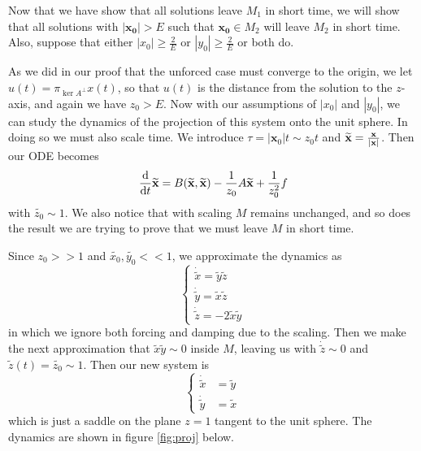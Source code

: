 \documentclass[11pt]{article}
\begin{document}
Now that we have show that all solutions leave $M_1$ in short time, we will show that all solutions with $|\mathbf{x_0}| > E$ such that $\mathbf{x_0} \in M_2$ will leave $M_2$ in short time. Also, suppose that either $|x_0| \geq \frac{2}{E}$ or $|y_0| \geq \frac{2}{E}$ or both do.

As we did in our proof that the unforced case must converge to the origin, we let $u(t) = \pi_{\ker A^{\perp}} x(t)$, so that $u(t)$ is the distance from the solution to the $z$-axis, and again we have $z_0 > E$. Now with our assumptions of $|x_0|$ and $|y_0|$, we can study the dynamics of the projection of this system onto the unit sphere. In doing so we must also scale time. We introduce $\tau = |\mathbf{x}_0|t \sim z_0t$ and $\widetilde{\mathbf{x}} = \frac{\mathbf{x}}{\abs{\mathbf{x}}}$. Then our ODE becomes 
\begin{equation}\label{eq:proj}
    \dv{}{t}\widetilde{\mathbf{x}} = B(\widetilde{\mathbf{x}}, \widetilde{\mathbf{x}}) - \frac{1}{z_0}A\widetilde{\mathbf{x}} + \frac{1}{z_0^2}f
\end{equation}
with $\widetilde{z_0} \sim 1$. We also notice that with scaling $M$ remains unchanged, and so does the result we are trying to prove that we must leave $M$ in short time. 

Since $z_0 >> 1$ and $\widetilde{x_0}, \widetilde{y_0}<< 1$, we approximate the dynamics as 
\begin{equation}\label{eq:approx}
\begin{cases}
\displaystyle
\dot{\widetilde{x}} = \widetilde{y}\widetilde{z}\\

\displaystyle
\dot{\widetilde{y}} = \widetilde{x}\widetilde{z}\\

\displaystyle
\dot{\widetilde{z}} = -2\widetilde{x}\widetilde{y}
\end{cases}
\end{equation}
in which we ignore both forcing and damping due to the scaling. Then we make the next approximation that $\widetilde{x}\widetilde{y} \sim 0$ inside $M$, leaving us with $\dot{\widetilde{z}} \sim 0$ and $\widetilde{z}(t) = \widetilde{z_0} \sim 1$. Then our new system is
\begin{equation}\label{eq:onplane}
\begin{cases}
\displaystyle
\dot{\widetilde{x}} &= \widetilde{y}\\

\displaystyle
\dot{\widetilde{y}} &= \widetilde{x}
\end{cases}
\end{equation}
which is just a saddle on the plane $z = 1$ tangent to the unit sphere. The dynamics are shown in figure \ref{fig:proj} below. 
\end{document}
